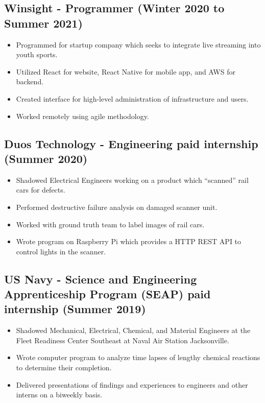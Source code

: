\documentclass{article}
\newenvironment{CustomItemize}
{ \begin{itemize}[leftmargin=1em]
    \setlength{\itemsep}{0pt}
    \setlength{\parskip}{0pt}
    \setlength{\parindent}{0pt}
    \setlength{\parsep}{0pt}     }
{ \end{itemize}                  }
\begin{document}
\subsection{Winsight - Programmer (Winter 2020 to Summer 2021)}
\begin{CustomItemize}
\item Programmed for startup company which seeks to integrate live streaming into youth sports.
\item Utilized React for website, React Native for mobile app, and AWS for backend.
\item Created interface for high-level administration of infrastructure and users.
\item Worked remotely using agile methodology.
\end{CustomItemize}

\subsection{Duos Technology - Engineering paid internship (Summer 2020)}
\begin{CustomItemize}
\item Shadowed Electrical Engineers working on a product which ``scanned'' rail cars for defects.
\item Performed destructive failure analysis on damaged scanner unit.
\item Worked with ground truth team to label images of rail cars.
\item Wrote program on Raspberry Pi which provides a HTTP REST API to control lights in the scanner.
\end{CustomItemize}

\subsection{US Navy - Science and Engineering Apprenticeship Program (SEAP) paid internship (Summer 2019)}
\begin{CustomItemize}
\item Shadowed Mechanical, Electrical, Chemical, and Material Engineers at the Fleet Readiness Center Southeast at Naval Air Station Jacksonville.
\item Wrote computer program to analyze time lapses of lengthy chemical reactions to determine their completion.
\item Delivered presentations of findings and experiences to engineers and other interns on a biweekly basis.
\end{CustomItemize}
\end{document}

